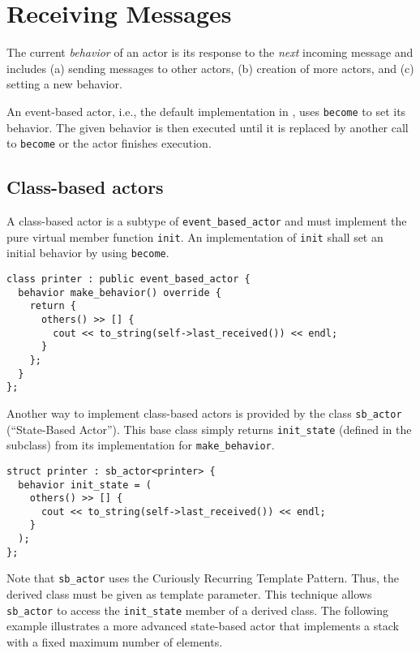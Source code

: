 \section{Receiving Messages}
\label{Sec::Receive}

The current \textit{behavior} of an actor is its response to the \textit{next} incoming message and includes (a) sending messages to other actors, (b) creation of more actors, and (c) setting a new behavior.

An event-based actor, i.e., the default implementation in \libcppa, uses \lstinline^become^ to set its behavior.
The given behavior is then executed until it is replaced by another call to \lstinline^become^ or the actor finishes execution.

\subsection{Class-based actors}

A class-based actor is a subtype of \lstinline^event_based_actor^ and must implement the pure virtual member function \lstinline^init^.
An implementation of \lstinline^init^ shall set an initial behavior by using \lstinline^become^.

\begin{lstlisting}
class printer : public event_based_actor {
  behavior make_behavior() override {
    return {
      others() >> [] {
        cout << to_string(self->last_received()) << endl;
      }
    };
  }
};
\end{lstlisting}

Another way to implement class-based actors is provided by the class \lstinline^sb_actor^ (``State-Based Actor'').
This base class simply returns \lstinline^init_state^ (defined in the subclass) from its implementation for \lstinline^make_behavior^.

\begin{lstlisting}
struct printer : sb_actor<printer> {
  behavior init_state = (
    others() >> [] {
      cout << to_string(self->last_received()) << endl;
    }
  );
};
\end{lstlisting}

Note that \lstinline^sb_actor^ uses the Curiously Recurring Template Pattern. Thus, the derived class must be given as template parameter.
This technique allows \lstinline^sb_actor^ to access the \lstinline^init_state^ member of a derived class.
The following example illustrates a more advanced state-based actor that implements a stack with a fixed maximum number of elements.

